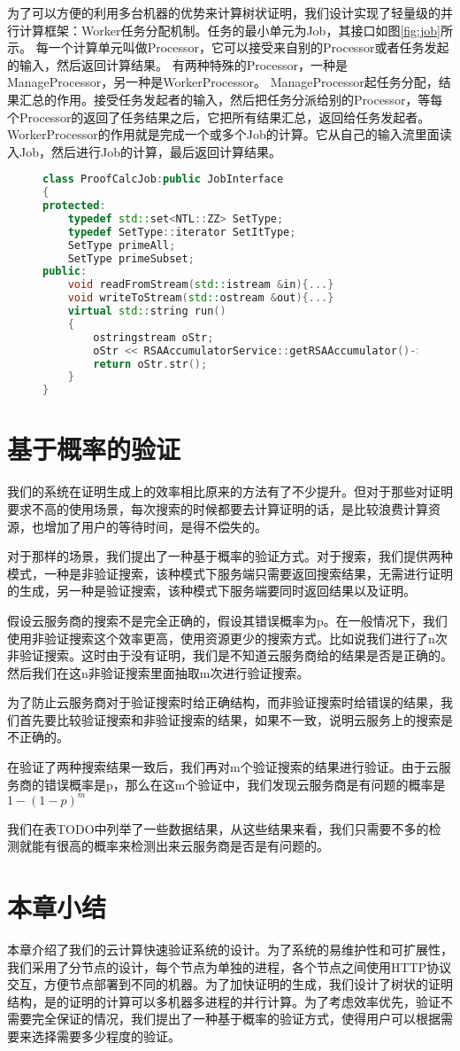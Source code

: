 为了可以方便的利用多台机器的优势来计算树状证明，我们设计实现了轻量级的并行计算框架：Worker任务分配机制。任务的最小单元为Job，其接口如图\ref{fig:job}所示。
每一个计算单元叫做Processor，它可以接受来自别的Processor或者任务发起的输入，然后返回计算结果。
有两种特殊的Processor，一种是ManageProcessor，另一种是WorkerProcessor。
ManageProcessor起任务分配，结果汇总的作用。接受任务发起者的输入，然后把任务分派给别的Processor，等每个Processor的返回了任务结果之后，它把所有结果汇总，返回给任务发起者。
WorkerProcessor的作用就是完成一个或多个Job的计算。它从自己的输入流里面读入Job，然后进行Job的计算，最后返回计算结果。
\begin{figure}[htb]
\begin{lstlisting}[language=C++] 
class ProofCalcJob:public JobInterface
{
protected:
    typedef std::set<NTL::ZZ> SetType;
    typedef SetType::iterator SetItType;
    SetType primeAll;
    SetType primeSubset;
public:
    void readFromStream(std::istream &in){...}
    void writeToStream(std::ostream &out){...}
    virtual std::string run()
	{
        ostringstream oStr;
        oStr << RSAAccumulatorService::getRSAAccumulator()->publicGenSubsetProof(primeAll, primeSubset);
        return oStr.str();
	}
}
\end{lstlisting}
\end{figure}
\section{基于概率的验证}
我们的系统在证明生成上的效率相比原来的方法有了不少提升。但对于那些对证明要求不高的使用场景，每次搜索的时候都要去计算证明的话，是比较浪费计算资源，也增加了用户的等待时间，是得不偿失的。

对于那样的场景，我们提出了一种基于概率的验证方式。对于搜索，我们提供两种模式，一种是非验证搜索，该种模式下服务端只需要返回搜索结果，无需进行证明的生成，另一种是验证搜索，该种模式下服务端要同时返回结果以及证明。

假设云服务商的搜索不是完全正确的，假设其错误概率为p。在一般情况下，我们使用非验证搜索这个效率更高，使用资源更少的搜索方式。比如说我们进行了n次非验证搜索。这时由于没有证明，我们是不知道云服务商给的结果是否是正确的。然后我们在这n非验证搜索里面抽取m次进行验证搜索。

为了防止云服务商对于验证搜索时给正确结构，而非验证搜索时给错误的结果，我们首先要比较验证搜索和非验证搜索的结果，如果不一致，说明云服务上的搜索是不正确的。

在验证了两种搜索结果一致后，我们再对m个验证搜索的结果进行验证。由于云服务商的错误概率是p，那么在这m个验证中，我们发现云服务商是有问题的概率是$1-(1-p)^m$

我们在表TODO中列举了一些数据结果，从这些结果来看，我们只需要不多的检测就能有很高的概率来检测出来云服务商是否是有问题的。
\section{本章小结}
本章介绍了我们的云计算快速验证系统的设计。为了系统的易维护性和可扩展性，我们采用了分节点的设计，每个节点为单独的进程，各个节点之间使用HTTP协议交互，方便节点部署到不同的机器。为了加快证明的生成，我们设计了树状的证明结构，是的证明的计算可以多机器多进程的并行计算。为了考虑效率优先，验证不需要完全保证的情况，我们提出了一种基于概率的验证方式，使得用户可以根据需要来选择需要多少程度的验证。
